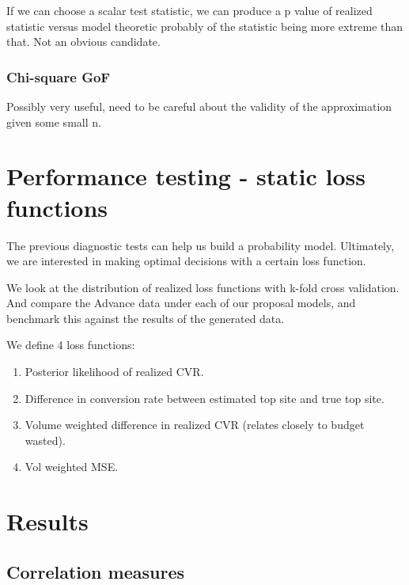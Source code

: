 \documentclass[12pt]{article}
\begin{document}
If we can choose a scalar test statistic, we can produce a p value of realized statistic versus model theoretic probably of the statistic being more extreme than that. Not an obvious candidate.

\subsubsection{Chi-square GoF}

Possibly very useful, need to be careful about the validity of the approximation given some small n.

\section{ Performance testing - static loss functions }

The previous diagnostic tests can help us build a probability model. Ultimately, we are interested in making optimal decisions with a certain loss function. 

We look at the distribution of realized loss functions with k-fold cross validation. And compare the Advance data under each of our proposal models, and benchmark this against the results of the generated data.

We define 4 loss functions:
\begin{enumerate}
	\item Posterior likelihood of realized CVR. 
	\item Difference in conversion rate between estimated top site and true top site.
	\item Volume weighted difference in realized CVR (relates closely to budget wasted). 
	\item Vol weighted MSE.
\end{enumerate}
\section{Results}

\subsection{Correlation measures}
\end{document}
